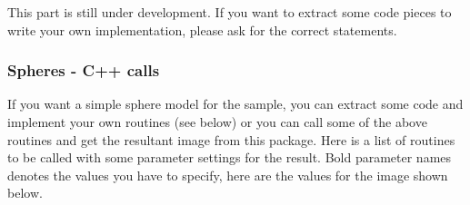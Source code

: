 \documentclass[11pt]{article} %
\begin{document}
This part is still under development. If you want to extract some code pieces to write your own implementation, please ask for the correct statements.

\subsubsection{Spheres - C++ calls}

If you want a simple sphere model for the sample, you can extract some code and implement your own routines (see below) or you can call some of the above routines and get the resultant image from this package. Here is a list of routines to be called with some parameter settings for the result. Bold parameter names denotes the values you have to specify, here are the values for the image shown below.
\end{document}
